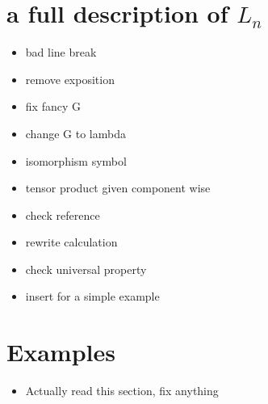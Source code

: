 \documentclass{amsart}
\begin{document}
\section{a full description of $L_n $}
\begin{itemize}
\item bad line break
\item remove exposition
\item fix fancy G
\item change G to lambda
\item isomorphism symbol
\item tensor product given component wise
\item check reference
\item rewrite calculation
\item check universal property
\item insert for a simple example
\end{itemize}
\section{ Examples}
\begin{itemize}
\item Actually read this section, fix anything
\end{itemize}
\end{document}
